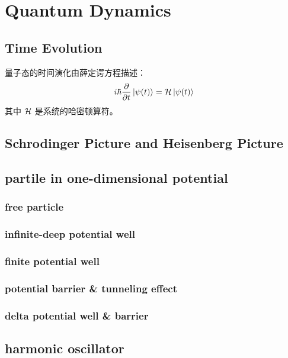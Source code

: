 \chapter{Quantum Dynamics}
\section{Time Evolution}
量子态的时间演化由薛定谔方程描述：
\begin{equation}
    i\hbar \frac{\partial}{\partial t} \left|\psi(t)\right> = \mathcal{H} \left|\psi(t)\right>
\end{equation}
其中 $\mathcal{H}$ 是系统的哈密顿算符。

\section{Schrodinger Picture and Heisenberg Picture}
\section{partile in one-dimensional potential}
\subsection{free particle}
\subsection{infinite-deep potential well}
\subsection{finite potential well}
\subsection{potential barrier \& tunneling effect}
\subsection{delta potential well \& barrier}
\section{harmonic oscillator}




